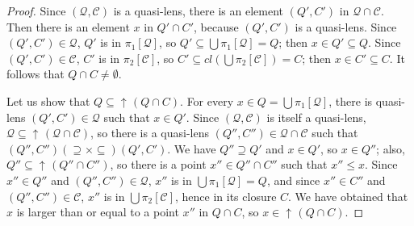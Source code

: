 \documentclass[preprint,12pt]{elsarticle}
\DeclareMathOperator{\upc}{\uparrow\!}
\begin{document}
\begin{proof}
  Since $(\mathcal Q, \mathcal C)$ is a quasi-lens, there is an
  element $(Q', C')$ in $\mathcal Q \cap \mathcal C$.  Then there is
  an element $x$ in $Q' \cap C'$, because $(Q', C')$ is a quasi-lens.
  Since $(Q', C') \in \mathcal Q$, $Q'$ is in $\pi_1 [\mathcal Q]$, so
  $Q' \subseteq \bigcup \pi_1 [\mathcal Q] = Q$; then
  $x \in Q' \subseteq Q$.  Since $(Q', C') \in \mathcal C$, $C'$ is in
  $\pi_2 [\mathcal C]$, so
  $C' \subseteq cl (\bigcup \pi_2 [\mathcal C]) =C$; then
  $x \in C' \subseteq C$.  It follows that $Q \cap C \neq \emptyset$.
  
  Let us show that $Q \subseteq \upc (Q \cap C)$.  For every
  $x \in Q = \bigcup \pi_1 [\mathcal Q]$, there is quasi-lens
  $(Q', C') \in \mathcal Q$ such that $x \in Q'$.  Since
  $(\mathcal Q, \mathcal C)$ is itself a quasi-lens,
  $\mathcal Q \subseteq \upc (\mathcal Q \cap \mathcal C)$, so there
  is a quasi-lens $(Q'', C'') \in \mathcal Q \cap \mathcal C$ such
  that $(Q'', C'') \mathrel{(\supseteq \times \subseteq)} (Q', C')$.
  We have $Q'' \supseteq Q'$ and $x \in Q'$, so $x \in Q''$; also,
  $Q'' \subseteq \upc (Q'' \cap C'')$, so there is a point
  $x'' \in Q'' \cap C''$ such that $x'' \leq x$.  Since $x'' \in Q''$
  and $(Q'', C'') \in \mathcal Q$, $x''$ is in
  $\bigcup \pi_1 [\mathcal Q] = Q$, and since $x'' \in C''$ and
  $(Q'', C'') \in \mathcal C$, $x''$ is in
  $\bigcup \pi_2 [\mathcal C]$, hence in its closure $C$.  We have
  obtained that $x$ is larger than or equal to a point $x''$ in
  $Q \cap C$, so $x \in \upc (Q \cap C)$.


\end{proof}
\end{document}

